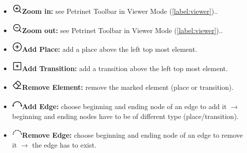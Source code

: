 \documentclass[10pt, a4paper]{article}
\begin{document}
\begin{itemize}
\item\includegraphics[scale=0.4]{../../src/resources/images/Toolbar/zoom-in.png}\hspace{0.1cm}\textbf{Zoom in:} see Petrinet Toolbar in Viewer Mode (\ref{label:viewer})..
\item\includegraphics[scale=0.4]{../../src/resources/images/Toolbar/zoom-out.png}\hspace{0.1cm}\textbf{Zoom out:} see Petrinet Toolbar in Viewer Mode (\ref{label:viewer})..
\item\includegraphics[scale=0.4]{../../src/resources/images/Toolbar/add-circle.png}\hspace{0.1cm}\textbf{Add Place:} add a place above the left top most element.
\item\includegraphics[scale=0.4]{../../src/resources/images/Toolbar/add-square.png}\hspace{0.1cm}\textbf{Add Transition:} add a transition above the left top most element.
\item\includegraphics[scale=0.4]{../../src/resources/images/Toolbar/erase.png}\hspace{0.1cm}\textbf{Remove Element:} remove the marked element (place or transition).
\item\includegraphics[scale=0.4]{../../src/resources/images/Toolbar/arc.png}\hspace{0.1cm}\textbf{Add Edge:} choose beginning and ending node of an edge to add it $\rightarrow$ beginning and ending nodes have to be of different type (place/transition).
\item\includegraphics[scale=0.4]{../../src/resources/images/Toolbar/remove-edge.png}\hspace{0.1cm}\textbf{Remove Edge:} choose beginning and ending node of an edge to remove it $\rightarrow$ the edge has to exist.

\end{itemize}
\end{document}
